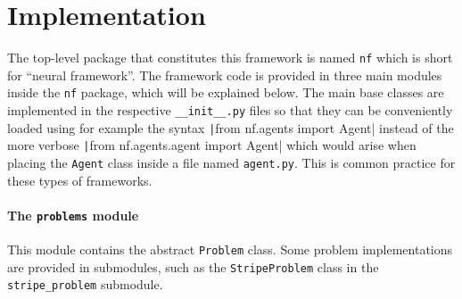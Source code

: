 \section{Implementation}
\label{sec:framework_implementation}
The top-level package that constitutes this framework is named \texttt{nf} which is short for ``neural framework''.
The framework code is provided in three main modules inside the \texttt{nf} package, which will be explained below.
The main base classes are implemented in the respective \texttt{\_\_init\_\_.py} files so that they can be conveniently loaded using for example the syntax
\texttt|from nf.agents import Agent|
instead of the more verbose
\texttt|from nf.agents.agent import Agent|
which would arise when placing the \texttt{Agent} class inside a file named \texttt{agent.py}.
This is common practice for these types of frameworks.

\paragraph{The \texttt{problems} module}
This module contains the abstract \texttt{Problem} class. 
Some problem implementations are provided in submodules, such as the \texttt{StripeProblem} class in the \texttt{stripe\_problem} submodule.

